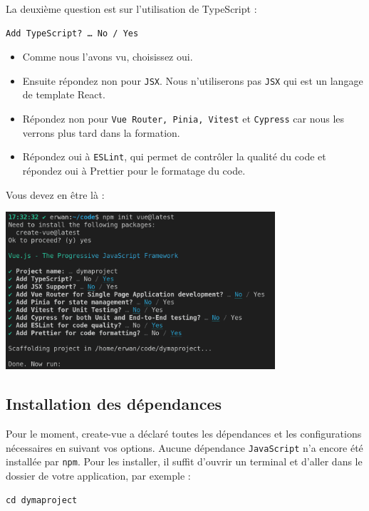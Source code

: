 \documentclass{article}
\begin{document}
La deuxième question est sur l'utilisation de TypeScript :
\begin{verbatim}
Add TypeScript? … No / Yes
\end{verbatim}
\begin{itemize}
\item Comme nous l'avons vu, choisissez {\color{blue} oui}.
\item Ensuite répondez {\color{blue} non} pour {\tt JSX}. Nous n'utiliserons pas {\tt JSX} qui est un langage de template React.
\item Répondez {\color{blue} non} pour {\tt Vue Router, Pinia, Vitest} et {\tt Cypress} car nous les verrons plus tard dans la formation.
\item Répondez {\color{blue} oui} à {\tt ESLint}, qui permet de contrôler la qualité du code et répondez oui à Prettier pour le formatage du code.
\end{itemize}


Vous devez en être là :
\begin{center}
\includegraphics[width=10cm]{images/image04.png}
\end{center}

\subsection{Installation des dépendances}
Pour le moment, {\color{monOrange}create-vue} a déclaré toutes les dépendances et les configurations nécessaires en suivant vos options. Aucune dépendance {\tt JavaScript} n'a encore été installée par {\tt npm}. Pour les installer, il suffit d'ouvrir un terminal et d'aller dans le dossier de votre application, par exemple :
\begin{verbatim}
cd dymaproject
\end{verbatim}
\end{document}
